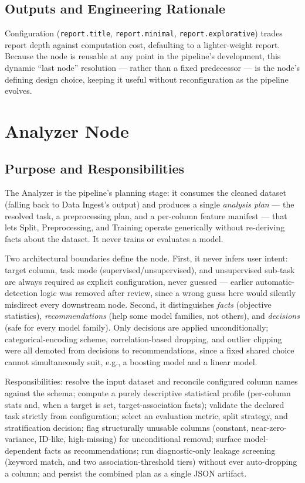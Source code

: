 \subsection{Outputs and Engineering Rationale}
\label{subsec:profiling-outputs}

Configuration (\texttt{report.title}, \texttt{report.minimal}, \texttt{report.explorative}) trades report depth against computation cost, defaulting to a lighter-weight report. Because the node is reusable at any point in the pipeline's development, this dynamic ``last node'' resolution --- rather than a fixed predecessor --- is the node's defining design choice, keeping it useful without reconfiguration as the pipeline evolves.

\section{Analyzer Node}
\label{sec:impl-analyzer}

\subsection{Purpose and Responsibilities}
\label{subsec:analyzer-overview}

The Analyzer is the pipeline's planning stage: it consumes the cleaned dataset (falling back to Data Ingest's output) and produces a single \emph{analysis plan} --- the resolved task, a preprocessing plan, and a per-column feature manifest --- that lets Split, Preprocessing, and Training operate generically without re-deriving facts about the dataset. It never trains or evaluates a model.

Two architectural boundaries define the node. First, it never infers user intent: target column, task mode (supervised/unsupervised), and unsupervised sub-task are always required as explicit configuration, never guessed --- earlier automatic-detection logic was removed after review, since a wrong guess here would silently misdirect every downstream node. Second, it distinguishes \emph{facts} (objective statistics), \emph{recommendations} (help some model families, not others), and \emph{decisions} (safe for every model family). Only decisions are applied unconditionally; categorical-encoding scheme, correlation-based dropping, and outlier clipping were all demoted from decisions to recommendations, since a fixed shared choice cannot simultaneously suit, e.g., a boosting model and a linear model.

Responsibilities: resolve the input dataset and reconcile configured column names against the schema; compute a purely descriptive statistical profile (per-column stats and, when a target is set, target-association facts); validate the declared task strictly from configuration; select an evaluation metric, split strategy, and stratification decision; flag structurally unusable columns (constant, near-zero-variance, ID-like, high-missing) for unconditional removal; surface model-dependent facts as recommendations; run diagnostic-only leakage screening (keyword match, and two association-threshold tiers) without ever auto-dropping a column; and persist the combined plan as a single JSON artifact.

